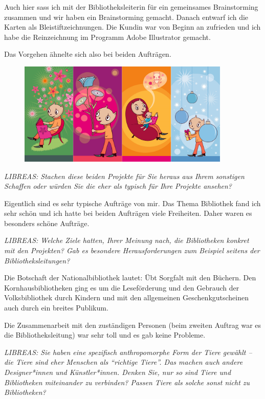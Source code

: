 \documentclass[a4paper,
fontsize=11pt,
oneside,
numbers=noperiodatend,
parskip=half-,
bibliography=totoc,
final
]{scrartcl}
\begin{document}
Auch hier sass ich mit der Bibliotheksleiterin für ein gemeinsames
Brainstorming zusammen und wir haben ein Brainstorming gemacht. Danach
entwarf ich die Karten als Bleistiftzeichnungen. Die Kundin war von
Beginn an zufrieden und ich habe die Reinzeichnung im Programm Adobe
Illustrator gemacht.

Das Vorgehen ähnelte sich also bei beiden Aufträgen.

\begin{figure}[h!]
\centering
\includegraphics[width=0.9\textwidth]{img/image2.png}
\end{figure}

\emph{LIBREAS: Stachen diese beiden
Projekte für Sie heraus aus Ihrem sonstigen Schaffen oder würden Sie die
eher als typisch für Ihre Projekte ansehen?}

Eigentlich sind es sehr typische Aufträge von mir. Das Thema Bibliothek
fand ich sehr schön und ich hatte bei beiden Aufträgen viele Freiheiten.
Daher waren es besonders schöne Aufträge.

\emph{LIBREAS: Welche Ziele hatten, Ihrer Meinung nach, die Bibliotheken
konkret mit den Projekten? Gab es besondere Herausforderungen zum
Beispiel seitens der Bibliotheksleitungen?}

Die Botschaft der Nationalbibliothek lautet: Übt Sorgfalt mit den
Büchern. Den Kornhausbibliotheken ging es um die Leseförderung und den
Gebrauch der Volksbibliothek durch Kindern und mit den allgemeinen
Geschenkgutscheinen auch durch ein breites Publikum.

Die Zusammenarbeit mit den zuständigen Personen (beim zweiten Auftrag
war es die Bibliotheksleitung) war sehr toll und es gab keine Probleme.

\emph{LIBREAS: Sie haben eine spezifisch anthropomorphe Form der Tiere
gewählt -- die Tiere sind eher Menschen als \enquote{richtige Tiere}.
Das machen auch andere Designer*innen und Künstler*innen. Denken Sie,
nur so sind Tiere und Bibliotheken miteinander zu verbinden? Passen
Tiere als solche sonst nicht zu Bibliotheken?}
\end{document}
